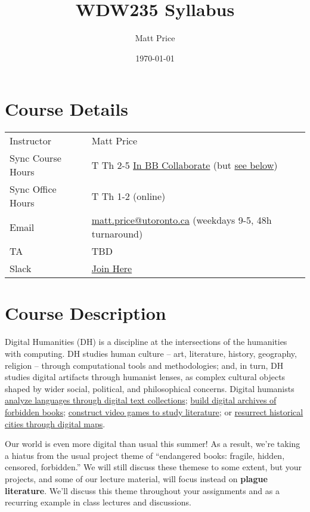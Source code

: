 \documentclass[11pt]{article}
\author{Matt Price}
\date{\today}
\title{WDW235 Syllabus}
\begin{document}
\maketitle

\section*{Course Details}
\label{sec:orge755fbd}
\begin{center}
\begin{tabular}{ll}
Instructor & Matt Price\\
Sync Course Hours & T Th 2-5 \href{https://q.utoronto.ca/courses/157875/external\_tools/246}{In BB Collaborate} (but \hyperref[sec:org786621a]{see below})\\
Sync Office Hours & T Th 1-2  (online)\\
Email & \href{mailto:matt.price@utoronto.ca}{matt.price@utoronto.ca} (weekdays 9-5, 48h turnaround)\\
TA & TBD\\
Slack & \href{https://join.slack.com/t/uoftdh/shared\_invite/zt-fq2pcjk4-Y3Vvyu6\~tNDjYbfH\~T6mJA}{Join Here}\\
\end{tabular}
\end{center}

\section*{Course Description}
\label{sec:org1ab6785}
Digital Humanities (DH) is a discipline at the intersections of the humanities with computing.  DH studies human culture -- art, literature, history, geography, religion -- through computational tools and methodologies; and, in turn, DH studies digital artifacts through humanist lenses, as complex cultural objects shaped by wider social, political, and philosophical concerns. Digital humanists \href{http://www.doe.utoronto.ca}{analyze languages through digital text collections}; \href{https://samizdat.library.utoronto.ca/}{build digital archives of forbidden books}; \href{http://sites.utm.utoronto.ca/gillespie/content/welcome-book-fame}{construct video games to study literature}; or \href{https://decima-map.net/}{resurrect historical cities through digital maps}.

Our world is even more digital than usual this summer! As a result, we're taking a hiatus from the usual project theme of ``endangered books: fragile, hidden, censored, forbidden.'' We will still discuss these themese to some extent, but your projects, and some of our lecture material, will focus instead on \textbf{plague literature}. We'll discuss this theme throughout your assignments and as a recurring example in class lectures and discussions. 
\end{document}
